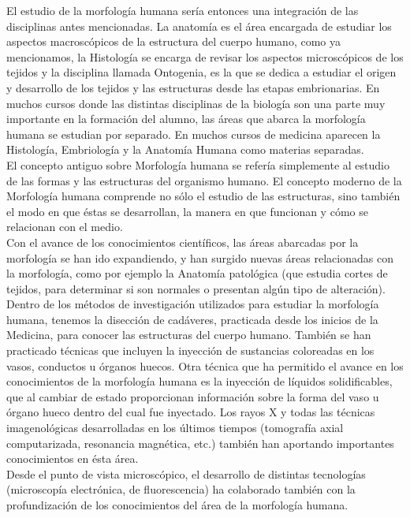 El estudio de la morfología humana sería entonces una integración de 
las disciplinas antes mencionadas. La anatomía es el área encargada de estudiar los 
aspectos macroscópicos de la estructura del cuerpo humano, como ya mencionamos,
la Histología se encarga de revisar los aspectos microscópicos de los tejidos 
y la disciplina llamada Ontogenia, es la que se dedica a estudiar el origen 
y desarrollo de los tejidos y las estructuras desde las etapas embrionarias.
En muchos cursos donde las distintas disciplinas de la biología  son una parte muy importante en la formación del alumno, las áreas que abarca la morfología 
humana se estudian por separado. En muchos cursos de medicina aparecen la Histología, Embriología y la Anatomía Humana como materias separadas.\\
El concepto antiguo sobre Morfología humana se refería simplemente al estudio de las formas y  las estructuras del organismo humano. 
El concepto moderno de la Morfología humana comprende no sólo el estudio de las estructuras, sino también el modo en que éstas se desarrollan, 
la manera en que funcionan y cómo se relacionan con el medio.\\
Con el avance de los conocimientos científicos, las áreas abarcadas por la morfología se han ido expandiendo, y han surgido nuevas áreas relacionadas con la morfología, 
como por ejemplo la Anatomía patológica (que estudia cortes de tejidos, para determinar  si son normales o presentan algún tipo de alteración).\\
Dentro de los métodos de investigación utilizados para estudiar la morfología humana, tenemos la disección de cadáveres, practicada desde los inicios de la Medicina, 
para conocer las estructuras del cuerpo humano. También se han practicado técnicas que incluyen la inyección de sustancias coloreadas en los vasos, conductos u órganos huecos. 
Otra técnica que ha permitido el avance en los conocimientos de la morfología humana es la inyección de líquidos solidificables, que al cambiar de estado proporcionan información 
sobre la forma del vaso u órgano hueco dentro del cual fue inyectado. Los rayos X y todas las técnicas imagenológicas desarrolladas en los últimos tiempos 
(tomografía axial computarizada, resonancia magnética, etc.) también han aportando importantes conocimientos en ésta área.\\
Desde el punto de vista microscópico, el desarrollo de distintas tecnologías (microscopía electrónica, de fluorescencia) ha colaborado también con la profundización de los 
conocimientos del área de la morfología humana.\\

